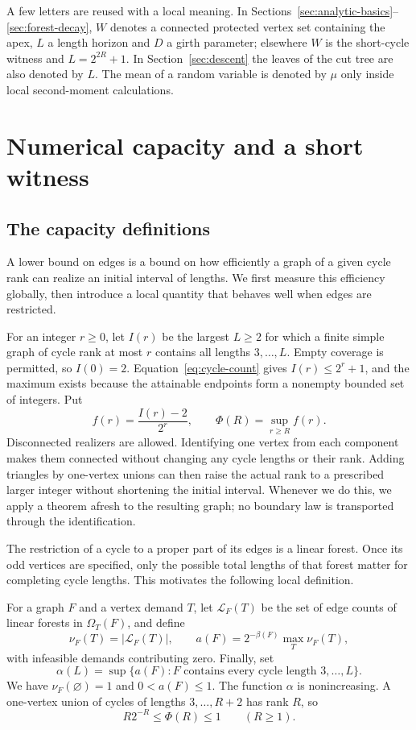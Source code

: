 \documentclass[11pt,a4paper]{article}
\numberwithin{equation}{section}
\theoremstyle{definition}
\theoremstyle{remark}
\newcommand{\Om}{\Omega}
\begin{document}
A few letters are reused with a local meaning. In Sections~\ref{sec:analytic-basics}--\ref{sec:forest-decay}, $W$ denotes a connected protected vertex set containing the apex, $L$ a length horizon and $D$ a girth parameter; elsewhere $W$ is the short-cycle witness and $L=2^{2R}+1$. In Section~\ref{sec:descent} the leaves of the cut tree are also denoted by $L$. The mean of a random variable is denoted by $\mu$ only inside local second-moment calculations.

\section{Numerical capacity and a short witness}\label{sec:capacity}
\subsection{The capacity definitions}
A lower bound on edges is a bound on how efficiently a graph of a given cycle rank can realize an initial interval of lengths. We first measure this efficiency globally, then introduce a local quantity that behaves well when edges are restricted.

For an integer $r\ge0$, let $I(r)$ be the largest $L\ge2$ for which a finite simple graph of cycle rank at most $r$ contains all lengths $3,\ldots,L$. Empty coverage is permitted, so $I(0)=2$. Equation~\eqref{eq:cycle-count} gives $I(r)\le2^r+1$, and the maximum exists because the attainable endpoints form a nonempty bounded set of integers. Put
\[
 f(r)=\frac{I(r)-2}{2^r},\qquad \Phi(R)=\sup_{r\ge R}f(r).
\]
Disconnected realizers are allowed. Identifying one vertex from each component makes them connected without changing any cycle lengths or their rank. Adding triangles by one-vertex unions can then raise the actual rank to a prescribed larger integer without shortening the initial interval. Whenever we do this, we apply a theorem afresh to the resulting graph; no boundary law is transported through the identification.

The restriction of a cycle to a proper part of its edges is a linear forest. Once its odd vertices are specified, only the possible total lengths of that forest matter for completing cycle lengths. This motivates the following local definition.

For a graph $F$ and a vertex demand $T$, let $\mathcal L_F(T)$ be the set of edge counts of linear forests in $\Om_T(F)$, and define
\[
 \nu_F(T)=|\mathcal L_F(T)|,\qquad
 a(F)=2^{-\beta(F)}\max_T\nu_F(T),
\]
with infeasible demands contributing zero. Finally, set
\[
 \alpha(L)=\sup\{a(F):F\text{ contains every cycle length }3,\ldots,L\}.
\]
We have $\nu_F(\varnothing)=1$ and $0<a(F)\le1$. The function $\alpha$ is nonincreasing. A one-vertex union of cycles of lengths $3,\ldots,R+2$ has rank $R$, so
\begin{equation}\label{eq:calibration}
 R2^{-R}\le\Phi(R)\le1\qquad(R\ge1).
\end{equation}
\end{document}
